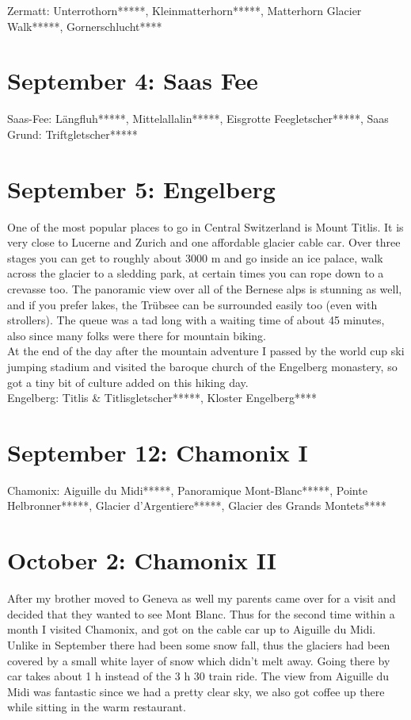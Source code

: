 Zermatt: Unterrothorn*****, Kleinmatterhorn*****, Matterhorn Glacier Walk*****, Gornerschlucht****

\section{September 4: Saas Fee}
\label{2010SaasFee}

Saas-Fee: L\"angfluh*****, Mittelallalin*****, Eisgrotte Feegletscher*****, Saas Grund: Triftgletscher*****

\section{September 5: Engelberg}
\label{2010Titlis}

One of the most popular places to go in Central Switzerland is Mount Titlis. It is very close to Lucerne and Zurich and one affordable glacier cable car. Over three stages you can get to roughly about 3000 m and go inside an ice palace, walk across the glacier to a sledding park, at certain times you can rope down to a crevasse too. The panoramic view over all of the Bernese alps is stunning as well, and if you prefer lakes, the Tr\"ubsee can be surrounded easily too (even with strollers). The queue was a tad long with a waiting time of about 45 minutes, also since many folks were there for mountain biking.\\

At the end of the day after the mountain adventure I passed by the world cup ski jumping stadium and visited the baroque church of the Engelberg monastery, so got a tiny bit of culture added on this hiking day.\\

Engelberg: Titlis \& Titlisgletscher*****, Kloster Engelberg****

\section{September 12: Chamonix I}
\label{2010ChamonixI}

Chamonix: Aiguille du Midi*****, Panoramique Mont-Blanc*****, Pointe Helbronner*****, Glacier d'Argentiere*****, Glacier des Grands Montets****

\section{October 2: Chamonix II}
\label{2010ChamonixII}

After my brother moved to Geneva as well my parents came over for a visit and decided that they wanted to see Mont Blanc. Thus for the second time within a month I visited Chamonix, and got on the cable car up to Aiguille du Midi. Unlike in September there had been some snow fall, thus the glaciers had been covered by a small white layer of snow which didn't melt away. Going there by car takes about 1 h instead of the 3 h 30 train ride. The view from Aiguille du Midi was fantastic since we had a pretty clear sky, we also got coffee up there while sitting in the warm restaurant.\\

